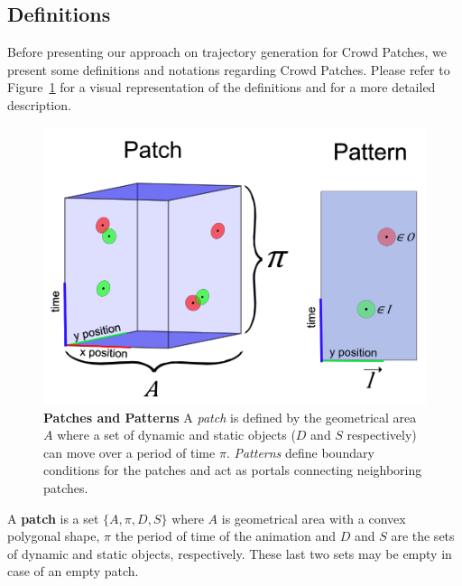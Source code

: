 \subsection{Definitions}
\label{sec:method:definitions}

Before presenting our approach on trajectory generation for Crowd Patches, we present some definitions and notations regarding Crowd Patches.
Please refer to Figure~\ref{fig:definitions} for a visual representation of the definitions and \cite{Yersin:2009} for a more detailed description.

\begin{figure}
\begin{center}
	\includegraphics[width=0.9\linewidth]{./images/patch-definitions.png}
	\caption{
		\textbf{Patches and Patterns} A \emph{patch} is defined by the geometrical area $A$ where a set of dynamic and static objects ($D$ and $S$ respectively) can move over a period of time $\pi$. \emph{Patterns} define boundary conditions for the patches and act as portals connecting neighboring patches. 
	}
	\label{fig:definitions}
	\end{center}
\end{figure}
 

A \textbf{patch} is a set $\{ A, \pi, D, S\}$ where $A$ is geometrical area with a convex polygonal shape, $\pi$ the period of time of the animation and $D$ and $S$ are the sets of dynamic and static objects, respectively. 
These last two sets may be empty in case of an empty patch.

